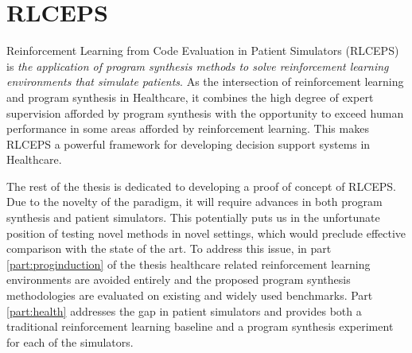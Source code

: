 \newpage
\section{RLCEPS}
\label{sec:patient-sRLCEF}

\begin{highlight}
Reinforcement Learning from Code Evaluation in Patient Simulators (RLCEPS) is \emph{the application of program synthesis methods to solve reinforcement learning environments that simulate patients}.
As the intersection of reinforcement learning and program synthesis in Healthcare, it combines the high degree of expert supervision afforded by program synthesis with the opportunity to exceed human performance in some areas afforded by reinforcement learning.
This makes RLCEPS a powerful framework for developing decision support systems in Healthcare.
\end{highlight}

The rest of the thesis is dedicated to developing a proof of concept of RLCEPS.
Due to the novelty of the paradigm, it will require advances in both program synthesis and patient simulators.
This potentially puts us in the unfortunate position of testing novel methods in novel settings, which would preclude effective comparison with the state of the art.
To address this issue, in part \ref{part:proginduction} of the thesis healthcare related reinforcement learning environments are avoided entirely and the proposed program synthesis methodologies are evaluated on existing and widely used benchmarks.
Part \ref{part:health} addresses the gap in patient simulators and provides both a traditional reinforcement learning baseline and a program synthesis experiment for each of the simulators.